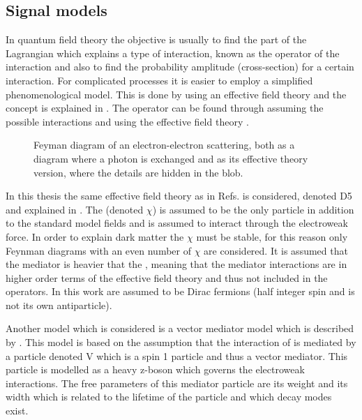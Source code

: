 \subsection{Signal models}\label{sec:tb:subsec:eft}
In quantum field theory the objective is usually to find the part of the Lagrangian which explains a type of interaction, known as the operator of the interaction and also to find the probability amplitude (cross-section) for a certain interaction. For complicated processes it is easier to employ a simplified phenomenological model. This is done by using an effective field theory and the concept is explained in . The operator can be found through assuming the possible interactions and using the effective field theory \citep{Zee:2003}. 
 \begin{figure}[H] %
    \hfill
    \caption{Feyman diagram of an electron-electron scattering, both as a diagram where a photon is exchanged and as its effective theory version, where the details are hidden in the blob.}
    \label{fig:feymanc}
  \end{figure}
In this thesis the same effective field theory as in Refs. \citep{82.116010,Goodman:2010} is considered, denoted D5 and explained in . The \abbrWIMP (denoted $\chi$) is assumed to be the only particle in addition to the standard model fields and is assumed to interact through the electroweak force. In order to explain dark matter the \abbrWIMP $\chi$ must be stable, for this reason only Feynman diagrams with an even number of $\chi$ are considered. It is assumed that the mediator is heavier that the \abbrWIMPS, meaning that the mediator interactions are in higher order terms of the effective field theory and thus not included in the operators. In this work \abbrWIMPS are assumed to be Dirac fermions (half integer spin and is not its own antiparticle). 

Another model which is considered is a vector mediator model which is described by . This model is based on the assumption that the interaction of \abbrWIMPS is mediated by a particle denoted V which is a spin 1 particle and thus a vector mediator. This particle is modelled as a heavy z-boson which governs the electroweak interactions. The free parameters of this mediator particle are its weight and its width which is related to the lifetime of the particle and which decay modes exist. 

